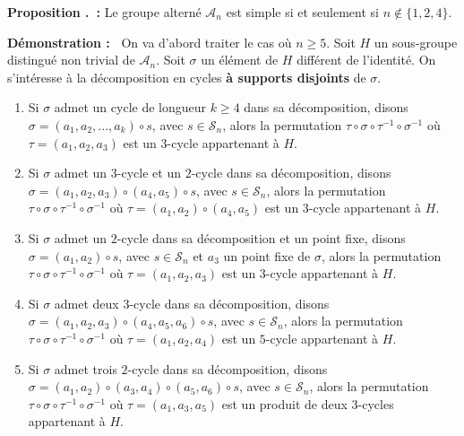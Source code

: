 \documentclass[5pt,a4paper]{article}
\newcounter{propcounter}[subsection]
\renewcommand{\thepropcounter}{\thesubsection.\arabic{propcounter}}
\newcommand{\prop}[1]{
    \stepcounter{propcounter}
    \hypertarget{p:\thepropcounter}{}%
    \noindent\textbf{Proposition \thepropcounter ~:} #1 \newline
}
\newcommand{\demo}[1]{
    \textbf{Démonstration :~} #1 \newline
}
\begin{document}
\begin{onehalfspacing}
\prop{Le groupe alterné $\mathcal{A}_n$ est simple si et seulement si $n \notin \{1, 2, 4\}$.}
\demo{On va d'abord traiter le cas où $n \geq 5$. Soit $H$ un sous-groupe distingué non trivial  de $\mathcal{A}_n$. Soit $\sigma$ un élément de $H$ différent de l'identité. On s'intéresse à la décomposition en cycles \textbf{à supports disjoints} de $\sigma$. 
	\begin{enumerate}
	\item Si $\sigma$ admet un cycle de longueur $k \geq 4$ dans sa décomposition, disons $\sigma = (a_1, a_2, ..., a_k) \circ s$, avec $s \in \mathcal{S}_n$, alors la permutation $\tau \circ \sigma \circ \tau^{-1} \circ \sigma ^{-1}$ où $\tau = (a_1, a_2, a_3)$ est un $3$-cycle appartenant à $H$.
	\item Si $\sigma$ admet un $3$-cycle et un $2$-cycle dans sa décomposition, disons $\sigma = (a_1, a_2, a_3) \circ (a_4, a_5) \circ s$, avec $s \in \mathcal{S}_n$, alors la permutation $\tau \circ \sigma \circ \tau^{-1} \circ \sigma ^{-1}$ où $\tau = (a_1, a_2) \circ (a_4, a_5)$ est un $3$-cycle appartenant à $H$.
	\item Si $\sigma$ admet un $2$-cycle dans sa décomposition et un point fixe, disons $\sigma = (a_1, a_2) \circ s$, avec $s \in \mathcal{S}_n$ et $a_3$ un point fixe de $\sigma$, alors la permutation $\tau \circ \sigma \circ \tau^{-1} \circ \sigma ^{-1}$ où $\tau = (a_1, a_2, a_3)$ est un $3$-cycle appartenant à $H$.
	\item Si $\sigma$ admet deux $3$-cycle dans sa décomposition, disons $\sigma = (a_1, a_2, a_3) \circ (a_4, a_5, a_6) \circ s$, avec $s \in \mathcal{S}_n$, alors la permutation $\tau \circ \sigma \circ \tau^{-1} \circ \sigma ^{-1}$ où $\tau = (a_1, a_2, a_4)$ est un $5$-cycle appartenant à $H$.
	\item Si $\sigma$ admet trois $2$-cycle dans sa décomposition, disons $\sigma = (a_1, a_2) \circ (a_3, a_4) \circ (a_5, a_6) \circ s$, avec $s \in \mathcal{S}_n$, alors la permutation $\tau \circ \sigma \circ \tau^{-1} \circ \sigma ^{-1}$ où $\tau = (a_1, a_3, a_5)$ est un produit de deux $3$-cycles appartenant à $H$.
	\end{enumerate}
}
\end{onehalfspacing}
\end{document}
